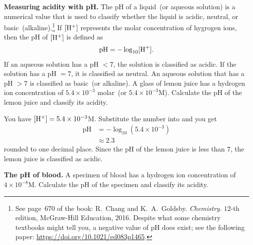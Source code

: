 \documentclass[a4paper,oneside,12pt]{article}
\begin{document}
\begin{example}
\textbf{Measuring acidity with pH.}
The pH of a liquid~(or aqueous solution) is a numerical value that is
used to classify whether the liquid is acidic, neutral, or
basic~(alkaline).\footnote{
  See page~670 of the book:
  R.~Chang and K.~A.~Goldsby. \emph{Chemistry}. $12$-th edition,
  McGraw-Hill Education, 2016.  Despite what some chemistry textbooks
  might tell you, a negative value of pH does exist; see the following
  paper: \url{https://doi.org/10.1021/ed083p1465}.
}
If $[{\rm H}^+]$ represents the molar concentration of hygrogen ions, then
the pH of $[{\rm H}^+]$ is defined as
\begin{equation}
\label{eqn:logarithm:pH}
\text{pH}
=
-\log_{10} [{\rm H}^+].
\end{equation}
If an aqueous solution has a pH $< 7$, the solution is classified as
acidic.  If the solution has a pH $ = 7$, it is classified as
neutral.  An aqueous solution that has a pH $> 7$ is classified as
basic~(or alkaline).  A glass of lemon juice has a hydrogen ion
concentration of $5.4 \times 10^{-3}$
molar~(or $5.4 \times 10^{-3}$M).  Calculate the pH of the lemon juice
and classify its acidity.
\end{example}

\begin{solution}
You have $[{\rm H}^+] = 5.4 \times 10^{-3}$M.  Substitute the number into
 and you get
\begin{align*}
\text{pH}
&=
-\log_{10} (5.4 \times 10^{-3}) \\[4pt]
&\approx
2.3
\end{align*}
rounded to one decimal place.  Since the pH of the lemon juice is less
than $7$, the lemon juice is classified as acidic.
\end{solution}

\begin{exercise}
\textbf{The pH of blood.}
A specimen of blood has a hydrogen ion concentration of
$4 \times 10^{-8}$M.  Calculate the pH of the specimen and classify
its acidity.
\end{exercise}

\end{document}
